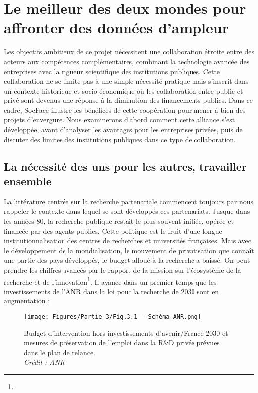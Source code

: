\chapter{Le meilleur des deux mondes pour affronter des données d’ampleur}

Les objectifs ambitieux de ce projet nécessitent une collaboration étroite entre des acteurs aux compétences complémentaires, combinant la technologie avancée des entreprises avec la rigueur scientifique des institutions publiques. Cette collaboration ne se limite pas à une simple nécessité pratique mais s’inscrit dans un contexte historique et socio-économique où les collaboration entre public et privé sont devenus une réponse à la diminution des financements publics. Dans ce cadre, SocFace illustre les bénéfices de cette coopération pour mener à bien des projets d’envergure. Nous examinerons d’abord comment cette alliance s’est développée, avant d’analyser les avantages pour les entreprises privées, puis de discuter des limites des institutions publiques dans ce type de collaboration. 

    \section{La nécessité des uns pour les autres, travailler ensemble}

La littérature centrée sur la recherche partenariale commencent toujours par nous rappeler le contexte dans lequel se sont développés ces partenariats. Jusque dans les années 80, la recherche publique restait le plus souvent initiée, opérée et financée par des agents publics. Cette politique est le fruit d’une longue institutionnalisation des centres de recherches et universités françaises. Mais avec le développement de la mondialisation, le mouvement de privatisation que connaît une partie des pays développés, le budget alloué à la recherche a baissé. On peut prendre les chiffres avancés par le rapport de la mission sur l’écosystème de la recherche et de l’innovation\footnote{}. Il avance dans un premier temps que les investissements de l’ANR dans la loi pour la recherche de 2030 sont en augmentation : 

\begin{figure}[H]
        \centering
        \texttt{[image: Figures/Partie 3/Fig.3.1 - Schéma ANR.png]}
        \caption{Budget d’intervention hors investissements d’avenir/France 2030 et mesures de préservation de l’emploi dans la R\&D privée prévues dans le plan de relance.\\
        \textit{Crédit : ANR}}
        \label{fig:Fig3.1}
    \end{figure}

